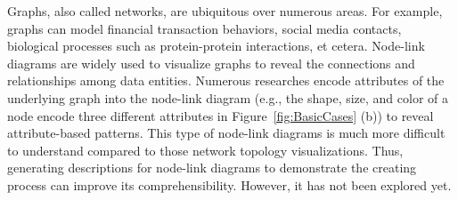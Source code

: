 \maketitle

Graphs, also called networks, are ubiquitous over numerous areas. For example, graphs can model financial transaction behaviors, social media contacts, biological processes such as protein-protein interactions, et cetera.
Node-link diagrams are widely used to visualize graphs to reveal the connections and relationships among data entities.
Numerous researches encode attributes of the underlying graph into the node-link diagram (e.g., the shape, size, and color of a node encode three different attributes in Figure~\ref{fig:BasicCases} (b)) to reveal attribute-based patterns.
This type of node-link diagrams is much more difficult to understand compared to those network topology visualizations. 
Thus, generating descriptions for node-link diagrams to demonstrate the creating process can improve its comprehensibility.
However, it has not been explored yet.

